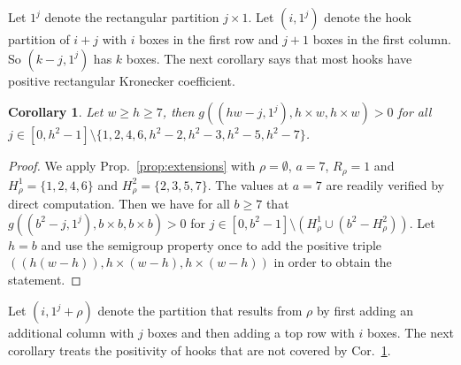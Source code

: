 \documentclass{article}
\numberwithin{equation}{section}
\newtheorem{corollary}[equation]{Corollary}
\theoremstyle{definition}
\begin{document}
Let $1^j$ denote the rectangular partition $j \times 1$.
Let $(i,1^j)$ denote the hook partition of $i+j$ with $i$ boxes in the first row and $j+1$ boxes in the first column.
So $(k-j,1^j)$ has $k$ boxes.
The next corollary says that most hooks have positive rectangular Kronecker coefficient.
\begin{corollary}\label{cor:hooks1} 
Let $w \geq h \geq 7$, then $g( (hw-j,1^j ), h \times w, h \times w)>0$ for all $j \in [0,h^2-1]\setminus \{1,2,4,6, h^2-2,h^2-3, h^2-5, h^2-7\}$.
\end{corollary} 
\begin{proof}
We apply Prop.~\ref{prop:extensions} with $\rho = \emptyset$, $a=7$, $R_\rho=1$ and $H^1_{\rho} = \{1,2,4,6\}$ and $H^2_\rho = \{2,3,5,7\}$. The values at $a=7$ are readily verified by direct computation. Then we have for all $b \geq 7$ that $g( (b^2-j,1^j), b \times b, b \times b )>0$ for 
$ j \in [0,b^2-1] \setminus (H^1_\rho \cup (b^2 - H^2_\rho) )$. Let $h=b$ and use the semigroup property once to add the positive triple $((h(w-h)), h \times (w-h), h \times (w-h))$ in order to obtain the statement. 
\end{proof}

Let $(i,1^j+\rho)$ denote the partition that results from $\rho$ by first adding an additional column with $j$ boxes and then adding a top row with $i$ boxes.
The next corollary treats the positivity of hooks that are not covered by Cor.~\ref{cor:hooks1}.
\end{document}

